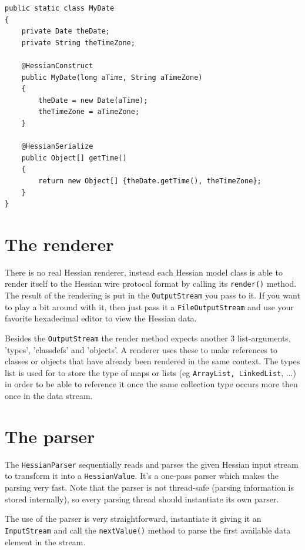 \documentclass[a4paper]{article}
\begin{document}
\medskip
\begin{lstlisting}
public static class MyDate
{
    private Date theDate;
    private String theTimeZone;

    @HessianConstruct
    public MyDate(long aTime, String aTimeZone)
    {
        theDate = new Date(aTime);
        theTimeZone = aTimeZone;
    }

    @HessianSerialize
    public Object[] getTime()
    {
        return new Object[] {theDate.getTime(), theTimeZone};
    }
}
\end{lstlisting}
\medskip
    
\section{The renderer}

There is no real Hessian renderer, instead each Hessian model class is able to render itself to the Hessian wire protocol format by calling its \lstinline$render()$ method. The result of the rendering is put in the \lstinline$OutputStream$ you pass to it. If you want to play a bit around with it, then just pass it a \lstinline$FileOutputStream$ and use your favorite hexadecimal editor to view the Hessian data.

Besides the \lstinline$OutputStream$ the render method expects another 3 list-arguments, 'types', 'classdefs' and 'objects'. A renderer uses these to make references to classes or objects that have already been rendered in the same context. The types list is used for to store the type of maps or lists (eg \lstinline$ArrayList, LinkedList$, ...) in order to be able to reference it once the same collection type occurs more then once in the data stream.

\section{The parser}

The \lstinline$HessianParser$ sequentially reads and parses the given Hessian input stream to transform it into a \lstinline$HessianValue$. It's a one-pass parser which makes the parsing very fast.  Note that the parser is not thread-safe (parsing information is stored internally), so every parsing thread should instantiate its own parser.

The use of the parser is very straightforward, instantiate it giving it an \lstinline$InputStream$ and call the \lstinline$nextValue()$ method to parse the first available data element in the stream. 
\end{document}
